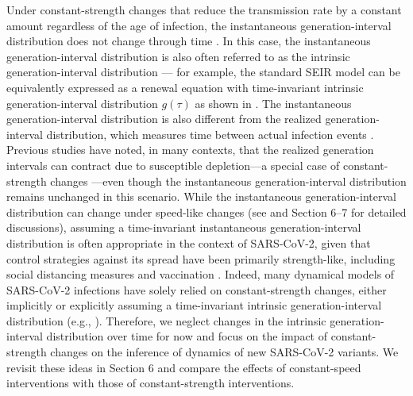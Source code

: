 \documentclass[12pt]{article}
\begin{document}
Under constant-strength changes that reduce the transmission rate by a constant amount regardless of the age of infection, the instantaneous generation-interval distribution does not change through time \citep{fraser2007estimating}.
In this case, the instantaneous generation-interval distribution is also often referred to as the intrinsic generation-interval distribution \citep{champredon2015intrinsic,champredon2018two,gostic2020practical,park2020time}---
for example, the standard SEIR model can be equivalently expressed as a renewal equation with time-invariant intrinsic generation-interval distribution $g(\tau)$ as shown in \citep{champredon2018equivalence}.
The instantaneous generation-interval distribution is also different from the realized generation-interval distribution, which measures time between actual infection events \citep{champredon2015intrinsic}.
Previous studies have noted, in many contexts, that the realized generation intervals can contract due to susceptible depletion---a special case of constant-strength changes \citep{kenah2008generation,nishiura2010time,champredon2015intrinsic}---even though the instantaneous generation-interval distribution remains unchanged in this scenario.
While the instantaneous generation-interval distribution can change under speed-like changes (see \cite{fraser2007estimating} and Section 6--7 for detailed discussions), assuming a time-invariant instantaneous generation-interval distribution is often appropriate in the context of SARS-CoV-2, given that control strategies against its spread have been primarily strength-like, including social distancing measures \citep{flaxman2020Rt} and vaccination \citep{moore2021vaccination}.
Indeed, many dynamical models of SARS-CoV-2 infections have solely relied on constant-strength changes, either implicitly or explicitly assuming a time-invariant intrinsic generation-interval distribution (e.g., \citep{flaxman2020Rt,gostic2020practical,brauner2021inferring}).
Therefore, we neglect changes in the intrinsic generation-interval distribution over time for now and focus on the impact of constant-strength changes on the inference of dynamics of new SARS-CoV-2 variants.
We revisit these ideas in Section 6 and compare the effects of constant-speed interventions with those of constant-strength interventions.
\end{document}

